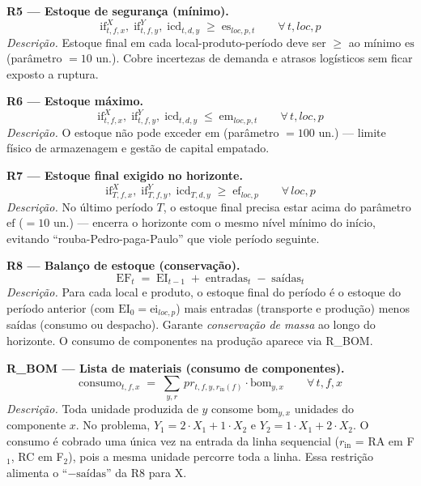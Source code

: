 \documentclass[11pt,a4paper]{article}
\begin{document}
\medskip
\noindent\textbf{R5 — Estoque de segurança (mínimo).}
\begin{equation}
\text{if}^X_{t,f,x},\; \text{if}^Y_{t,f,y},\; \text{icd}_{t,d,y} \;\geq\; \text{es}_{loc,p,t} \qquad \forall\,t,loc,p
\label{eq:R5}
\end{equation}
\emph{Descrição.} Estoque final em cada local-produto-período deve ser $\geq$ ao mínimo $\text{es}$ (parâmetro $= 10$ un.). Cobre incertezas de demanda e atrasos logísticos sem ficar exposto a ruptura.

\medskip
\noindent\textbf{R6 — Estoque máximo.}
\begin{equation}
\text{if}^X_{t,f,x},\; \text{if}^Y_{t,f,y},\; \text{icd}_{t,d,y} \;\leq\; \text{em}_{loc,p,t} \qquad \forall\,t,loc,p
\label{eq:R6}
\end{equation}
\emph{Descrição.} O estoque não pode exceder $\text{em}$ (parâmetro $= 100$ un.) — limite físico de armazenagem e gestão de capital empatado.

\medskip
\noindent\textbf{R7 — Estoque final exigido no horizonte.}
\begin{equation}
\text{if}^X_{T,f,x},\; \text{if}^Y_{T,f,y},\; \text{icd}_{T,d,y} \;\geq\; \text{ef}_{loc,p} \qquad \forall\,loc,p
\label{eq:R7}
\end{equation}
\emph{Descrição.} No último período $T$, o estoque final precisa estar acima do parâmetro $\text{ef}$ ($= 10$ un.) — encerra o horizonte com o mesmo nível mínimo do início, evitando ``rouba-Pedro-paga-Paulo'' que viole período seguinte.

\medskip
\noindent\textbf{R8 — Balanço de estoque (conservação).}
\begin{equation}
\text{EF}_{t} \;=\; \text{EI}_{t-1} \;+\; \text{entradas}_{t} \;-\; \text{saídas}_{t}
\label{eq:R8}
\end{equation}
\emph{Descrição.} Para cada local e produto, o estoque final do período é o estoque do período anterior (com $\text{EI}_0 = \text{ei}_{loc,p}$) mais entradas (transporte e produção) menos saídas (consumo ou despacho). Garante \emph{conservação de massa} ao longo do horizonte. O consumo de componentes na produção aparece via R\_BOM.

\medskip
\noindent\textbf{R\_BOM — Lista de materiais (consumo de componentes).}
\begin{equation}
\text{consumo}_{t,f,x} \;=\; \sum_{y,r}\, pr_{t,f,y,r_{\text{in}}(f)} \cdot \text{bom}_{y,x} \qquad \forall\,t,f,x
\label{eq:Rbom}
\end{equation}
\emph{Descrição.} Toda unidade produzida de $y$ consome $\text{bom}_{y,x}$ unidades do componente $x$. No problema, $Y_1 = 2 \cdot X_1 + 1 \cdot X_2$ e $Y_2 = 1 \cdot X_1 + 2 \cdot X_2$. O consumo é cobrado uma única vez na entrada da linha sequencial ($r_{\text{in}}$ = RA em F$_1$, RC em F$_2$), pois a mesma unidade percorre toda a linha. Essa restrição alimenta o ``$-\text{saídas}$'' da R8 para X.
\end{document}
